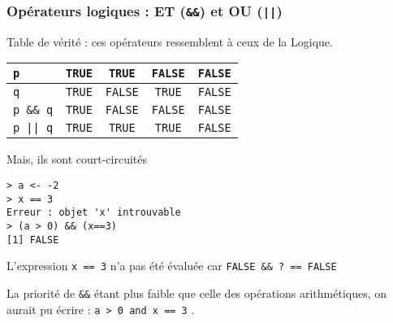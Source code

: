 \documentclass[10pt]{beamer}
\newcommand{\T}{\texttt{TRUE}}
\newcommand{\F}{\texttt{FALSE}}
\begin{document}
\begin{frame}[fragile]
  \frametitle{Opérateurs logiques : ET (\texttt{\&\&}) et OU (\texttt{||})}
  \begin{block}{Table de vérité : ces opérateurs ressemblent à ceux de la Logique.}
  \begin{table}
    \centering
    \begin{tabular}{|l|c|c|c|c|}
      \hline
      \texttt{p}        & \T & \T & \F & \F \\ \hline
      \texttt{q}        & \T & \F & \T & \F \\ \hline
      \texttt{p \&\& q} & \T & \F & \F & \F \\ \hline
      \texttt{p || q} & \T & \T & \T & \F \\ \hline
    \end{tabular}
  \end{table}
\end{block}


\begin{block}{Mais, ils sont court-circuités}
  \begin{lstlisting}[style=block]
> a <- -2
> x == 3
Erreur : objet 'x' introuvable
> (a > 0) && (x==3)
[1] FALSE    
\end{lstlisting}
L'expression \lstinline[columns=fixed]{x == 3} n'a pas été évaluée car \texttt{FALSE \&\& ? == FALSE}

La priorité de \texttt{\&\&} étant plus faible que celle des opérations arithmétiques,
on aurait pu écrire : \lstinline[columns=fixed]{a > 0 and x == 3} .

\end{block}
\end{frame}


\end{document}
